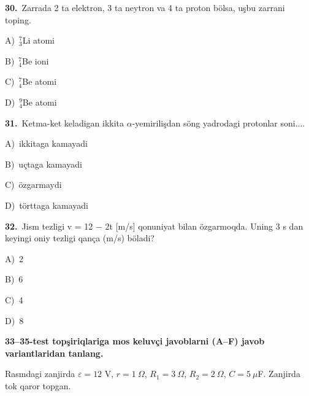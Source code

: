 \documentclass[11pt,a4paper]{article}
\newcommand{\opt}[2]{\hspace*{4mm}#1)\ #2\par}
\begin{document}
\noindent\begin{minipage}{\linewidth}
\textbf{30.}\ Zarrada 2 ta elektron, 3 ta neytron va 4 ta proton bölsa, uşbu zarrani toping.\par\smallskip
\opt{A}{$^{7}_{3}$Li atomi}
\opt{B}{$^{7}_{4}$Be ioni}
\opt{C}{$^{7}_{4}$Be atomi}
\opt{D}{$^{9}_{4}$Be atomi}
\end{minipage}\vspace{9pt}\par
\noindent\begin{minipage}{\linewidth}
\textbf{31.}\ Ketma-ket keladigan ikkita $\alpha$-yemirilişdan söng yadrodagi protonlar soni....\par\smallskip
\opt{A}{ikkitaga kamayadi}
\opt{B}{uçtaga kamayadi}
\opt{C}{özgarmaydi}
\opt{D}{törttaga kamayadi}
\end{minipage}\vspace{9pt}\par
\noindent\begin{minipage}{\linewidth}
\textbf{32.}\ Jism tezligi v = 12 $-$ 2t [m/s] qonuniyat bilan özgarmoqda. Uning 3 s dan keyingi oniy tezligi qança (m/s) böladi?\par\smallskip
\opt{A}{2}
\opt{B}{6}
\opt{C}{4}
\opt{D}{8}
\end{minipage}\vspace{9pt}\par
\newpage\noindent\textbf{33–35-test topşiriqlariga mos keluvçi javoblarni (A–F) javob variantlaridan tanlang.}\par\smallskip
Rasmdagi zanjirda $\varepsilon=12$ V, $r=1\ \Omega$, $R_1=3\ \Omega$, $R_2=2\ \Omega$, $C=5\ \mu$F. Zanjirda tok qaror topgan.\par\medskip
\begin{center}\end{center}
\end{document}
